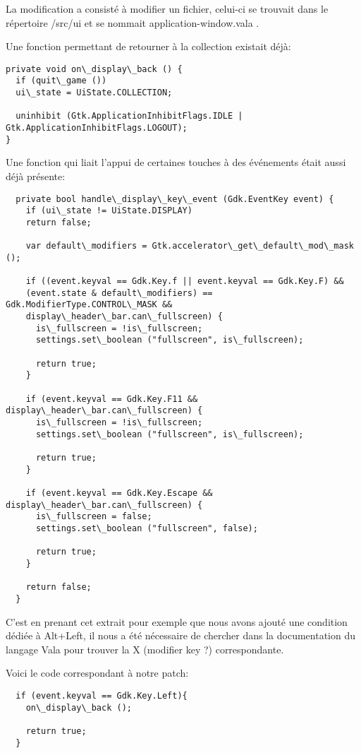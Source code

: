 \documentclass[12pt]{report}
\begin{document}
La modification a consisté à modifier un fichier, celui-ci se trouvait
dans le répertoire /src/ui et se nommait application-window.vala .

Une fonction permettant de retourner à la collection existait déjà:

\begin{verbatim}
private void on\_display\_back () {
  if (quit\_game ())
  ui\_state = UiState.COLLECTION;

  uninhibit (Gtk.ApplicationInhibitFlags.IDLE | Gtk.ApplicationInhibitFlags.LOGOUT);
}
\end{verbatim}

Une fonction qui liait l'appui de certaines touches à des événements
était aussi déjà présente:

\begin{verbatim}
  private bool handle\_display\_key\_event (Gdk.EventKey event) {
    if (ui\_state != UiState.DISPLAY)
    return false;

    var default\_modifiers = Gtk.accelerator\_get\_default\_mod\_mask ();

    if ((event.keyval == Gdk.Key.f || event.keyval == Gdk.Key.F) &&
    (event.state & default\_modifiers) == Gdk.ModifierType.CONTROL\_MASK &&
    display\_header\_bar.can\_fullscreen) {
      is\_fullscreen = !is\_fullscreen;
      settings.set\_boolean ("fullscreen", is\_fullscreen);

      return true;
    }

    if (event.keyval == Gdk.Key.F11 && display\_header\_bar.can\_fullscreen) {
      is\_fullscreen = !is\_fullscreen;
      settings.set\_boolean ("fullscreen", is\_fullscreen);

      return true;
    }

    if (event.keyval == Gdk.Key.Escape && display\_header\_bar.can\_fullscreen) {
      is\_fullscreen = false;
      settings.set\_boolean ("fullscreen", false);

      return true;
    }
    
    return false;
  }
\end{verbatim}

C'est en prenant cet extrait pour exemple que nous avons ajouté une
condition dédiée à Alt+Left, il nous a été nécessaire de chercher dans
la documentation du langage Vala pour trouver la X (modifier key ?)
correspondante.

Voici le code correspondant à notre patch:

\begin{verbatim}
  if (event.keyval == Gdk.Key.Left){			
    on\_display\_back ();
    
    return true;
  }
\end{verbatim}
\end{document}
